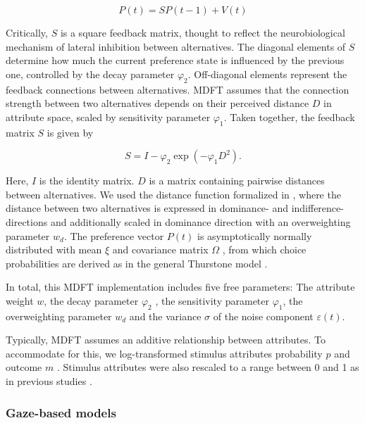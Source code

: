 \documentclass[11pt, a4paper]{article}
\begin{document}
\begin{equation}
    \label{eq:mdft:p}
    P(t) = SP(t - 1) + V(t)
\end{equation}

Critically, $S$ is a square feedback matrix, thought to reflect the neurobiological mechanism of lateral inhibition between alternatives. The diagonal elements of $S$ determine how much the current preference state is influenced by the previous one, controlled by the decay parameter $\varphi_2$. Off-diagonal elements represent the feedback connections between alternatives. MDFT assumes that the connection strength between two alternatives depends on their perceived distance $D$ in attribute space, scaled by sensitivity parameter $\varphi_1$. Taken together, the feedback matrix $S$ is given by

\begin{equation}
    \label{eq:mdft:s}
    S = I - \varphi_2 \exp{(-\varphi_1 D^2)}.
\end{equation}

Here, $I$ is the identity matrix. $D$ is a matrix containing pairwise distances between alternatives. We used the distance function formalized in \textcite{hotaling2010TheoreticalDevelopmentsDecision}, where the distance between two alternatives is expressed in dominance- and indifference-directions and additionally scaled in dominance direction with an overweighting parameter $w_d$. The preference vector $P(t)$ is asymptotically normally distributed with mean $\xi$ and covariance matrix $\Omega$ \parencite{busemeyer2002SurveyDecisionField}, from which choice probabilities are derived as in the general Thurstone model \parencite{bockenholt1992MultivariateModelsPreference}.

In total, this MDFT implementation includes five free parameters: The attribute weight $w$, the decay parameter $\varphi_2$ , the sensitivity parameter $\varphi_1$, the overweighting parameter $w_d$ and the variance $\sigma$ of the noise component $\varepsilon(t)$.

Typically, MDFT assumes an additive relationship between attributes. To accommodate for this, we log-transformed stimulus attributes probability $p$ and outcome $m$ \parencite[see][]{mohr2017AttractionEffectRisky}. Stimulus attributes were also rescaled to a range between 0 and 1 as in previous studies \parencite{berkowitsch2014RigorouslyTestingMultialternative}.

\subsubsection*{Gaze-based models}
\end{document}
